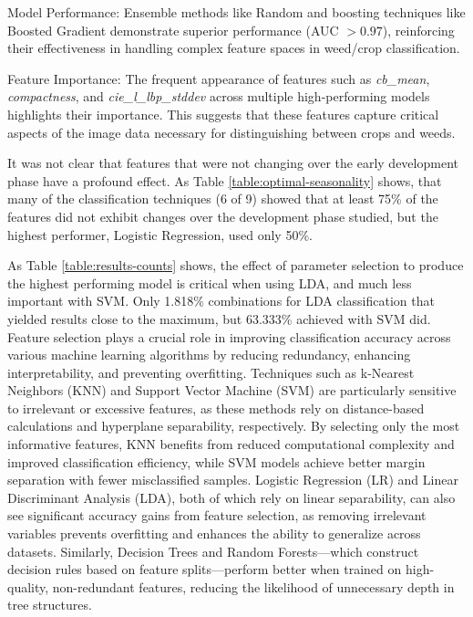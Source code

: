\documentclass[letterpaper, notitlepage]{report}
\begin{document}
Model Performance:
Ensemble methods like Random  and boosting techniques like Boosted Gradient demonstrate superior performance (AUC $> 0.97$), reinforcing their effectiveness in handling complex feature spaces in weed/crop classification.

Feature Importance:
The frequent appearance of features such as \textit{cb\_mean}, \textit{compactness}, and \textit{cie\_l\_lbp\_stddev} across multiple high-performing models highlights their importance. This suggests that these features capture critical aspects of the image data necessary for distinguishing between crops and weeds.

It was not clear that features that were not changing over the early development phase have a profound effect. As Table \ref{table:optimal-seasonality} shows, that many of the classification techniques (6 of 9) showed that at least 75\% of the features did not exhibit changes over the development phase studied, but the highest performer, Logistic Regression, used only 50\%.

As Table \ref{table:results-counts} shows, the effect of parameter selection to produce the highest performing model is critical when using LDA, and much less important with SVM. 
Only 1.818\% combinations for LDA classification that yielded results close to the maximum, but 63.333\% achieved with SVM did. 
Feature selection plays a crucial role in improving classification accuracy across various machine learning algorithms by reducing redundancy, enhancing interpretability, and preventing overfitting. Techniques such as k-Nearest Neighbors (KNN) and Support Vector Machine (SVM) are particularly sensitive to irrelevant or excessive features, as these methods rely on distance-based calculations and hyperplane separability, respectively. By selecting only the most informative features, KNN benefits from reduced computational complexity and improved classification efficiency, while SVM models achieve better margin separation with fewer misclassified samples. Logistic Regression (LR) and Linear Discriminant Analysis (LDA), both of which rely on linear separability, can also see significant accuracy gains from feature selection, as removing irrelevant variables prevents overfitting and enhances the ability to generalize across datasets. Similarly, Decision Trees and Random Forests—which construct decision rules based on feature splits—perform better when trained on high-quality, non-redundant features, reducing the likelihood of unnecessary depth in tree structures.
\end{document}
